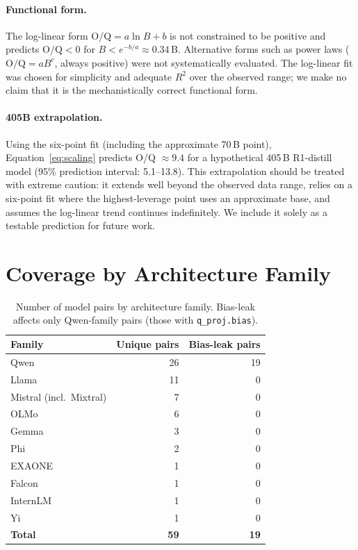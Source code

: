 \documentclass[11pt]{article}
\newcommand{\oq}{\text{O/Q}}
\begin{document}
\paragraph{Functional form.}
The log-linear form $\oq = a \ln B + b$ is not constrained to be positive and
predicts $\oq < 0$ for $B < e^{-b/a} \approx 0.34$\,B.
Alternative forms such as power laws ($\oq = aB^c$, always positive) were not
systematically evaluated.
The log-linear fit was chosen for simplicity and adequate $R^2$ over the
observed range; we make no claim that it is the mechanistically correct
functional form.

\paragraph{405B extrapolation.}
Using the six-point fit (including the approximate 70\,B point),
Equation~\ref{eq:scaling} predicts O/Q $\approx 9.4$ for a hypothetical
405\,B R1-distill model (95\% prediction interval: 5.1--13.8).
This extrapolation should be treated with extreme caution: it extends well
beyond the observed data range, relies on a six-point fit where the
highest-leverage point uses an approximate base, and assumes the log-linear
trend continues indefinitely.
We include it solely as a testable prediction for future work.

\section{Coverage by Architecture Family}
\label{app:coverage}

\begin{table}[h]
\centering
\caption{Number of model pairs by architecture family.
Bias-leak affects only Qwen-family pairs (those with \texttt{q\_proj.bias}).}
\label{tab:coverage}
\begin{tabular}{lrr}
\toprule
Family & Unique pairs & Bias-leak pairs \\
\midrule
Qwen & 26 & 19 \\
Llama & 11 & 0 \\
Mistral (incl.\ Mixtral) & 7 & 0 \\
OLMo & 6 & 0 \\
Gemma & 3 & 0 \\
Phi & 2 & 0 \\
EXAONE & 1 & 0 \\
Falcon & 1 & 0 \\
InternLM & 1 & 0 \\
Yi & 1 & 0 \\
\midrule
\textbf{Total} & \textbf{59} & \textbf{19} \\
\bottomrule
\end{tabular}
\end{table}
\end{document}
